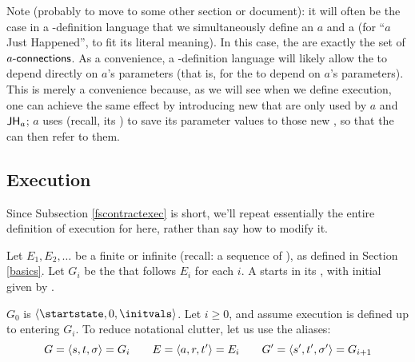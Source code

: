 \documentclass[12pt]{article}
\begin{document}
\bigskip

Note (probably to move to some other section or document): it will often be the case in a \Contract-definition language that we simultaneously define an \Action $a$ and a \State {} (for ``$a$ Just Happened'', to fit its literal meaning). In this case, the  are exactly the set of $a\textsf{-connections}$. As a convenience, a \Contract-definition language will likely allow the  to depend directly on $a$'s parameters (that is, for the \TGuard
to depend on $a$'s parameters). This is merely a convenience because, as we will see when we define execution, one can achieve the same effect by introducing new \GVars that are only used by $a$ and $\textsf{JH}_{a}$; $a$ uses  (recall, its \gvTransform) to save its parameter values to those new \GVars, so that the  can then refer to them.












\subsection{Execution} \label{gvarsexecution}

Since Subsection \ref{fscontractexec} is short, we'll repeat essentially the entire definition of execution for \FSContracts here, rather than say how to modify it.

\medskip

Let $E_1, E_2, \dots$ be a finite or infinite \trace (recall: a sequence of \Events), as defined in Section \ref{basics}. Let $G_i$ be the \GlobalState that follows $E_i$ for each $i$. A \Contract starts in its \startstate, with initial \gvarsassign given by \initvals.

$G_0$ is $\tup{\startstate, 0, \initvals}$.
Let $i \geq 0$, and assume execution is defined up to entering $G_i$. To reduce notational clutter, let us use the aliases:
\[ G = \langle s,t,\sigma\rangle = G_i  \qquad E = \langle a,r,t'\rangle =  E_i \qquad  G' = \langle s',t', \sigma'\rangle = G_{i+1}\]
\end{document}
